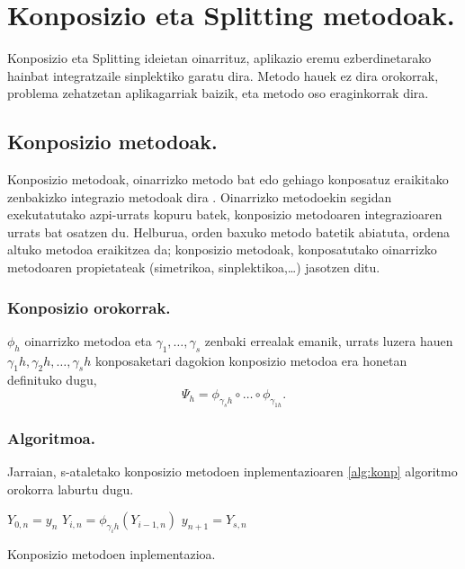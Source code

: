 \section{Konposizio eta Splitting metodoak.}

Konposizio eta Splitting ideietan oinarrituz, aplikazio eremu ezberdinetarako hainbat integratzaile sinplektiko \cite{SSerna2015b} garatu dira. Metodo hauek ez dira orokorrak, problema zehatzetan aplikagarriak baizik, eta metodo oso eraginkorrak dira.

\subsection{Konposizio metodoak.}

Konposizio metodoak, oinarrizko metodo bat edo gehiago konposatuz eraikitako zenbakizko integrazio metodoak dira \cite{Hairer2006}.  Oinarrizko metodoekin segidan exekutatutako azpi-urrats kopuru batek, konposizio metodoaren integrazioaren urrats bat osatzen du. Helburua, orden baxuko metodo batetik abiatuta, ordena altuko metodoa eraikitzea da; konposizio metodoak, konposatutako oinarrizko metodoaren propietateak (simetrikoa, sinplektikoa,\dots) jasotzen ditu. 

\subsubsection*{Konposizio orokorrak.}
$\phi_h$ oinarrizko metodoa eta $\gamma_1,\dots,\gamma_s$ zenbaki errealak emanik, urrats luzera hauen $\gamma_1 h,\gamma_2 h,\dots,\gamma_s h$ konposaketari dagokion konposizio metodoa era honetan definituko dugu,
\begin{equation}
\Psi_h=\phi_{\gamma_s h} \circ \dots \circ \phi_{\gamma_{1 h}}.
\end{equation}

\subsubsection*{Algoritmoa.}
Jarraian, s-ataletako konposizio metodoen inplementazioaren \ref{alg:konp} algoritmo orokorra laburtu dugu.

\begin{algorithm}[H]
 \BlankLine
  {
   \BlankLine
    $Y_{0,n}=y_{n} $\;
    \BlankLine
   {
    \BlankLine 
    $Y_{i,n}=\phi_{\gamma_i h}(Y_{i-1,n})$\;
   }
   \BlankLine
    $y_{n+1}=Y_{s,n}$\;
   \BlankLine
 }
 \caption{Konposizio metodoen inplementazioa.}
 \label{alg:konp}
\end{algorithm}
 
